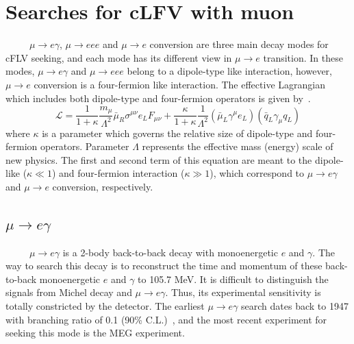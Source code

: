 \section{Searches for cLFV with muon}
~~~~~$\mu \rightarrow e\gamma$, $\mu \rightarrow eee$ and $\mu \rightarrow e$ conversion are three main decay modes for cFLV seeking, and each mode has its different view in $\mu \rightarrow e$ transition.
In these modes, $\mu \rightarrow e\gamma$ and $\mu \rightarrow eee$ belong to a dipole-type like interaction, however, $\mu \rightarrow e$ conversion is a four-fermion like interaction.
The effective Lagrangian which includes both dipole-type and four-fermion operators is given by~\cite{degou}.
\begin{equation}
 \mathcal{L} = \frac{1}{1+\kappa}\frac{m_\mu}{\Lambda^2}\bar{\mu}_R\sigma^{\mu\nu}e_LF_{\mu\nu} + \frac{\kappa}{1+\kappa}\frac{1}{\Lambda^2}(\bar\mu_L\gamma^\mu e_L)(\bar q_L\gamma_\mu q_L)
 \label{phtoeq}
\end{equation}
where $\kappa$ is a parameter which governs the relative size of dipole-type and four-fermion operators.
Parameter $\Lambda$ represents the effective mass (energy) scale of new physics.
The first and second term of this equation are meant to the dipole-like ($\kappa \ll 1$) and four-fermion interaction ($\kappa \gg 1$), which correspond to $\mu \rightarrow e\gamma$ and $\mu \rightarrow e$ conversion, respectively.

\subsection{$\mu \rightarrow e \gamma$}
~~~~~$\mu \rightarrow e\gamma$ is a 2-body back-to-back decay with monoenergetic $e$ and $\gamma$.
The way to search this decay is to reconstruct the time and momentum of these back-to-back monoenergetic $e$ and $\gamma$ to 105.7 MeV.
It is difficult to distinguish the signals from Michel decay and $\mu \rightarrow e\gamma$.
Thus, its experimental sensitivity is totally constricted by the detector.
The earliest $\mu \rightarrow e\gamma$ search dates back to 1947 with branching ratio of 0.1 (90\% C.L.)~\cite{1947}, and the most recent experiment for seeking this mode is the MEG experiment.


